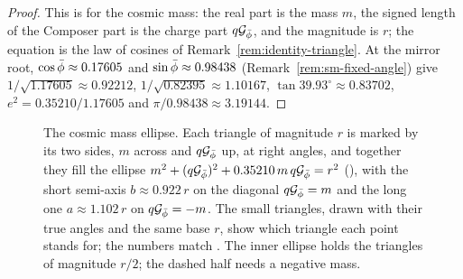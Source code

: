 \begin{proof}
This is  for the cosmic mass: the real part is the mass $m$, the signed length of the Composer part is the charge part $q\mathcal{G}_{\bar{\phi}}$, and the magnitude is $r$; the equation is the law of cosines of Remark~\ref{rem:identity-triangle}. At the mirror root, $\cos\bar{\phi} \approx 0.17605$ and $\sin\bar{\phi} \approx 0.98438$ (Remark~\ref{rem:sm-fixed-angle}) give $1/\sqrt{1.17605} \approx 0.92212$, $1/\sqrt{0.82395} \approx 1.10167$, $\tan 39.93^\circ \approx 0.83702$, $e^2 = 0.35210/1.17605$ and $\pi/0.98438 \approx 3.19144$.
\end{proof}

\begin{figure}[tb]
\myfloatalign

\caption[The cosmic mass ellipse]{The cosmic mass ellipse. Each triangle of magnitude $r$ is marked by its two sides, $m$ across and $q\mathcal{G}_{\bar{\phi}}$ up, at right angles, and together they fill the ellipse $m^2 + (q\mathcal{G}_{\bar{\phi}})^2 + 0.35210\,m\,q\mathcal{G}_{\bar{\phi}} = r^2$ (), with the short semi-axis $b \approx 0.922\,r$ on the diagonal $q\mathcal{G}_{\bar{\phi}} = m$ and the long one $a \approx 1.102\,r$ on $q\mathcal{G}_{\bar{\phi}} = -m$. The small triangles, drawn with their true angles and the same base $r$, show which triangle each point stands for; the numbers match . The inner ellipse holds the triangles of magnitude $r/2$; the dashed half needs a negative mass.}
\label{fig:sm-ellipse}
\end{figure}

